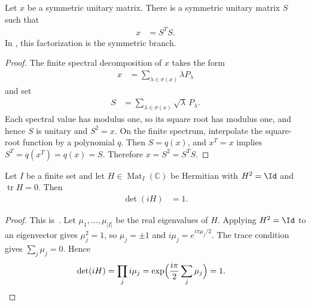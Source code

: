 \begin{lemma}
    \label{lem:mpu_symmetric_unitary_congruence}
    \leanok
    Let $x$ be a symmetric unitary matrix. There is a symmetric unitary matrix
    $S$ such that
    \begin{align}
        x & = S^T S.
    \end{align}
    In \cite[Lemma~\texttt{lemma:conjclass-normalform-continuous}]{Cirac2017MPU}, this factorization is the symmetric
    branch.
\end{lemma}

\begin{proof}\leanok
    The finite spectral decomposition of $x$ takes the form
    \begin{align}
        x & = \sum_{\lambda\in\sigma(x)} \lambda P_\lambda
    \end{align}
    and set
    \begin{align}
        S & = \sum_{\lambda\in\sigma(x)} \sqrt{\lambda}\,P_\lambda.
    \end{align}
    Each spectral value has modulus one, so its square root has modulus one,
    and hence $S$ is unitary and $S^2=x$. On the finite spectrum, interpolate
    the square-root function by a polynomial $q$. Then $S=q(x)$, and
    $x^T=x$ implies $S^T=q(x^T)=q(x)=S$. Therefore $x=S^2=S^T S$.
\end{proof}

\begin{lemma}
    \label{lem:mpu_det_i_hermitian_involution}
    \leanok
    Let $I$ be a finite set and let $H\in\operatorname{Mat}_I(\mathbb C)$ be
    Hermitian with $H^2=\Id$ and $\operatorname{tr}H=0$. Then
    \begin{align}
        \det(iH) & =1.
    \end{align}
\end{lemma}

\begin{proof}\leanok
    This is~\cite[``Determinant of $i$ times a traceless Hermitian
        involution'']{QICLean2026Blueprint}.
    Let $\mu_1,\dots,\mu_{|I|}$ be the real eigenvalues of $H$. Applying
    $H^2=\Id$ to an eigenvector gives $\mu_j^2=1$, so $\mu_j=\pm1$ and
    $i\mu_j=e^{i\pi\mu_j/2}$. The trace condition gives $\sum_j\mu_j=0$.
    Hence
    \begin{align}
        \det(iH)
         & =\prod_j i\mu_j
        =\exp\Bigl(\frac{i\pi}{2}\sum_j\mu_j\Bigr)
        =1.
    \end{align}
\end{proof}

